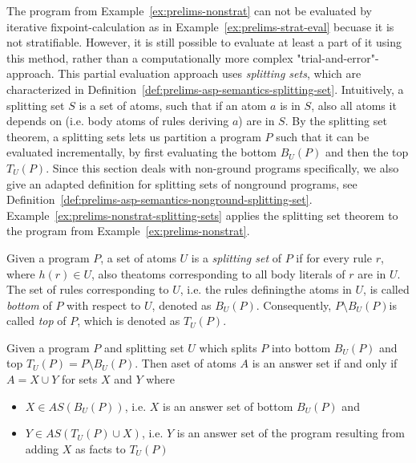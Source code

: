 The program from Example~\ref{ex:prelims-nonstrat} can not be evaluated by iterative fixpoint-calculation as in Example~\ref{ex:prelims-strat-eval} becuase it is not stratifiable. However, it is still possible to evaluate at least a part of it using this method, rather than a computationally more complex "trial-and-error"-approach. This partial evaluation approach uses \emph{splitting sets}, which are characterized in Definition~\ref{def:prelims-asp-semantics-splitting-set}. Intuitively, a splitting set $S$ is a set of atoms, such that if an atom $a$ is in $S$, also all atoms it depends on (i.e. body atoms of rules deriving $a$) are in $S$. By the splitting set theorem, a splitting sets lets us partition a program $P$ such that it can be evaluated incrementally, by first evaluating the bottom $B_U(P)$ and then the top $T_U(P)$. Since this section deals with non-ground programs specifically, we also give an adapted definition for splitting sets of nonground programs, see Definition~\ref{def:prelims-asp-semantics-nonground-splitting-set}. Example~\ref{ex:prelims-nonstrat-splitting-sets} applies the splitting set theorem to the program from Example~\ref{ex:prelims-nonstrat}.

\begin{definition}
\label{def:prelims-asp-semantics-splitting-set}
Given a program $P$, a set of atoms $U$ is a \emph{splitting set} of $P$ if for every rule $r$, where $h(r) \in U$, also theatoms corresponding to all body literals of $r$ are in $U$. The set of rules corresponding to $U$, i.e. the rules definingthe atoms in $U$, is called \emph{bottom} of $P$ with respect to $U$, denoted as $B_U(P)$. Consequently, $P \setminus B_U(P)$is called \emph{top} of $P$, which is denoted as $T_U(P)$.\\
\end{definition}

\begin{theorem}
Given a program $P$ and splitting set $U$ which splits $P$ into bottom $B_U(P)$ and top $T_U(P) = P \setminus B_U(P)$. Then aset of atoms $A$ is an answer set if and only if $A = X \cup Y$ for sets $X$ and $Y$ where
\begin{itemize}
	\item $X \in AS(B_U(P))$, i.e. $X$ is an answer set of bottom $B_U(P)$ and
	\item $Y \in AS(T_U(P) \cup X)$, i.e. $Y$ is an answer set of the program resulting from adding $X$ as facts to $T_U(P)$ 
\end{itemize}	
\end{theorem}	


